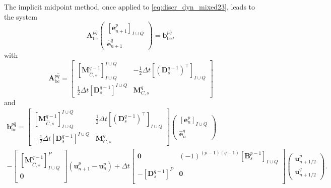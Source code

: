 \documentclass{elsarticle}
\newcommand*{\dual}[1]{\ensuremath{\widehat{#1}}}
\begin{document}
The implicit midpoint method, once applied to \eqref{eq:discr_dyn_mixed23}, leads to the system
\begin{equation}\label{eq:timediscr_23}
    \mathbf{A}^{p\dual{q}}_{\mathrm{bc}}
    \begin{pmatrix}
    [\mathbf{e}^p_{n+1}]_{I\cup Q} \\ \dual{\mathbf{e}}^q_{n+1}
    \end{pmatrix}
    = \mathbf{b}^{p\dual{q}}_{\mathrm{bc}},
\end{equation}
with
\begin{equation}
\mathbf{A}^{p\dual{q}}_{\mathrm{bc}} =
    \begin{bmatrix}
        [\mathbf{M}^{q-1}_{\dual{C}, s}]^{I\cup Q}_{I\cup Q} & -\frac{1}{2}\Delta t [(\mathbf{D}^{q-1}_s)^\top]_{I\cup Q} \\
        \frac{1}{2}\Delta t [\mathbf{D}_{s}^{q-1}]^{I\cup Q} & \mathbf{M}^{q}_{{C}, s}
    \end{bmatrix}
\end{equation}
and 
\begin{equation}
\begin{aligned}
\mathbf{b}^{p\dual{q}}_{\mathrm{bc}} = 
\begin{bmatrix}
        [\mathbf{M}^{q-1}_{\dual{C}, s}]^{I\cup Q}_{I\cup Q} & \frac{1}{2}\Delta t [(\mathbf{D}^{q-1}_s)^\top]_{I\cup Q} \\
        -\frac{1}{2}\Delta t [\mathbf{D}_{s}^{q-1}]^{I\cup Q} & \mathbf{M}^{q}_{{C}, s}
\end{bmatrix}
    \begin{pmatrix}
    [\mathbf{e}^p_{n}]_{I\cup Q} \\ \dual{\mathbf{e}}^q_{n}
    \end{pmatrix} \\
    -
    \begin{bmatrix}
        [\mathbf{M}^{q-1}_{\dual{C}, s}]_{I\cup Q}^{P} \\
        \mathbf{0} \\
    \end{bmatrix}(\mathbf{u}^p_{n+1} - \mathbf{u}^p_{n}) 
    + \Delta t \begin{bmatrix}
        \mathbf{0} & (-1)^{(p-1)(q-1)}[\mathbf{B}^{p-1}_{s}]_{I \cup Q} \\
        -[\mathbf{D}^{q-1}_s]^{P} & \mathbf{0}\\
    \end{bmatrix}
    \begin{pmatrix}
        \mathbf{u}^p_{n+1/2} \\
        \mathbf{u}^q_{n+1/2}
    \end{pmatrix}.
\end{aligned}
\end{equation}
\end{document}
